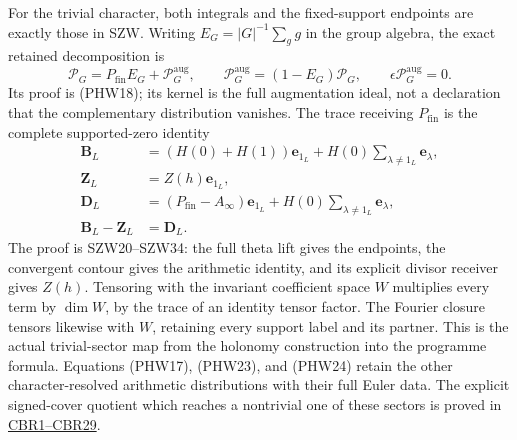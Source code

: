 \documentclass[
  10pt,
  a4paper,
]{article}
\begin{document}
For the trivial character, both integrals and the fixed-support
endpoints are exactly those in SZW. Writing \(E_G=|G|^{-1}\sum_g g\) in
the group algebra, the exact retained decomposition is \[
\mathscr P_G=P_{\mathrm{fin}}E_G+\mathscr P_G^{\mathrm{aug}},\qquad
\mathscr P_G^{\mathrm{aug}}=(1-E_G)\mathscr P_G,\qquad
\epsilon\mathscr P_G^{\mathrm{aug}}=0.
\tag{PHW24}
\] Its proof is (PHW18); its kernel is the full augmentation ideal, not
a declaration that the complementary distribution vanishes. The trace
receiving \(P_{\mathrm{fin}}\) is the complete supported-zero identity
\[
\begin{aligned}
\boldsymbol B_L&=(H(0)+H(1))\mathbf e_{1_L}
+H(0)\sum_{\lambda\ne1_L}\mathbf e_\lambda,\\
\boldsymbol Z_L&=Z(h)\mathbf e_{1_L},\\
\boldsymbol D_L&=(P_{\mathrm{fin}}-A_\infty)\mathbf e_{1_L}
+H(0)\sum_{\lambda\ne1_L}\mathbf e_\lambda,\\
\boldsymbol B_L-\boldsymbol Z_L&=\boldsymbol D_L.
\end{aligned}
\tag{PHW25}
\] The proof is SZW20--SZW34: the full theta lift gives the endpoints,
the convergent contour gives the arithmetic identity, and its explicit
divisor receiver gives \(Z(h)\). Tensoring with the invariant
coefficient space \(W\) multiplies every term by \(\dim W\), by the
trace of an identity tensor factor. The Fourier closure tensors likewise
with \(W\), retaining every support label and its partner. This is the
actual trivial-sector map from the holonomy construction into the
programme formula. Equations (PHW17), (PHW23), and (PHW24) retain the
other character-resolved arithmetic distributions with their full Euler
data. The explicit signed-cover quotient which reaches a nontrivial one
of these sectors is proved in
\href{https://github.com/KokunoYumeto/zeta-function-research-reader/blob/4a4238afc992e77aee83b97d38a1a63d283f540c/workbenches/splitzero-tandem/branches/tau-zero-prime-positivity/CLASS_FIELD_SIGNED_HOLONOMY_DERIVATION.md}{CBR1--CBR29}.
\end{document}
